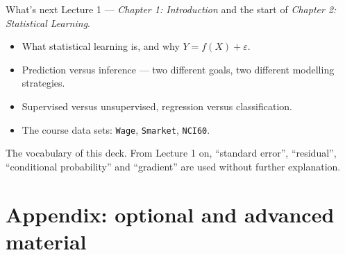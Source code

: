 \documentclass[aspectratio=169,11pt]{beamer}
\begin{document}
\begin{frame}{What's next}
  Lecture 1 --- \emph{Chapter 1: Introduction} and the start of
  \emph{Chapter 2: Statistical Learning}.
  \begin{itemize}
    \item What statistical learning is, and why $Y = f(X) + \varepsilon$.
    \item Prediction versus inference --- two different goals, two different
          modelling strategies.
    \item Supervised versus unsupervised, regression versus classification.
    \item The course data sets: \texttt{Wage}, \texttt{Smarket}, \texttt{NCI60}.
  \end{itemize}
  \begin{takeaway}
    The vocabulary of this deck. From Lecture 1 on, ``standard error'',
    ``residual'', ``conditional probability'' and ``gradient'' are used
    without further explanation.
  \end{takeaway}
\end{frame}


\appendix
\AtBeginSection[]{}
\section{Appendix: optional and advanced material}
\end{document}
